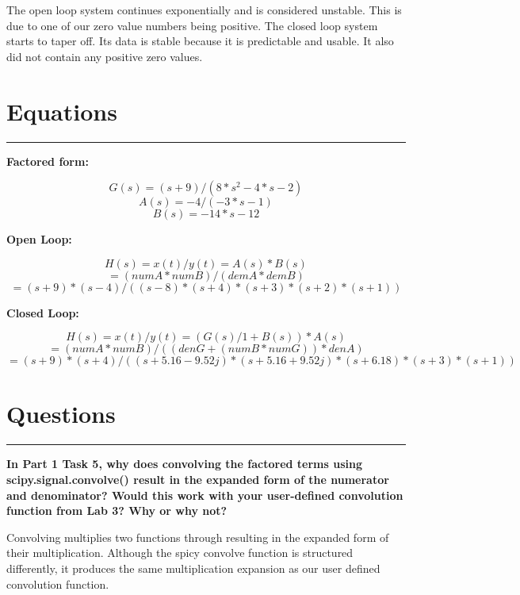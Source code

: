 \documentclass[12pt]{report}
\begin{document}
The open loop system continues exponentially and is considered unstable. This is due to one of our zero value numbers being positive. The closed loop system starts to taper off. Its data is stable because it is predictable and usable. It also did not contain any positive zero values. 

\section*{Equations}
\hrule
\vspace{1cm}
\setlength{\parindent}{5ex}

\begin{center}
    \textbf{Factored form:}
\end{center}
$$G(s) =  (s+9)/(8*s^{2} - 4*s -2)$$
\vspace{-.5cm}
$$A(s) = -4/ (-3*s -1)$$
\vspace{-.5cm}
$$B(s) = -14*s -12 $$

\begin{center}
    \textbf{Open Loop:}
\end{center}
$$H(s)= x(t)/ y(t) =  A(s) * B(s)$$
\vspace{-.5cm}
$$= (numA*numB)/ (demA*demB)$$
\vspace{-.5cm}
$$= (s+9)*(s-4) / ((s-8)*(s+4)*(s+3)*(s+2)*(s+1))$$

\begin{center}
    \textbf{Closed Loop:}
\end{center}
$$H(s) = x(t)/ y(t) =  (G(s)/1+B(s))*A(s)$$
$$ =  (numA*numB) / ((denG + (numB*numG))*denA)$$
$$=  (s+9)*(s+4)/((s+5.16-9.52j)*(s+5.16+9.52j)*(s+6.18)*(s+3)*(s+1))$$


\newpage
\section*{Questions}
\hrule
\vspace{1cm}
\setlength{\parindent}{5ex}
\textbf{In Part 1 Task 5, why does convolving the factored terms using scipy.signal.convolve() result in the expanded form of the numerator and denominator? Would this work with your user-defined convolution function from Lab 3? Why or why not?}\par
\vspace{.5cm}
Convolving multiplies two functions through resulting in the expanded form of their multiplication. Although the spicy convolve function is structured differently, it produces the same multiplication expansion as our user defined convolution function. 
\vspace{.5cm}
\end{document}
